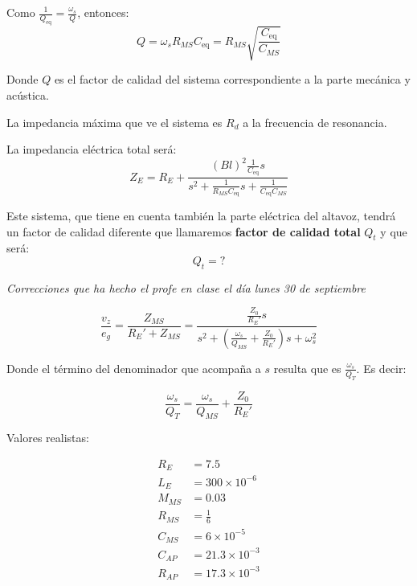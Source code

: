 \documentclass[12pt, a4paper]{article}
\begin{document}
Como $\frac{1}{Q _{\text{eq}}} = \frac{\omega_s}{Q}$, entonces:
\begin{equation} \label{eq:factor_calidad}
  Q = \omega_s R_{MS} C _{\text{eq}} = R_{MS} \sqrt{\frac{C _{\text{eq}}}{C_{MS}}}
\end{equation}

Donde $Q$ es el factor de calidad del sistema correspondiente a la parte mecánica y acústica.

La impedancia máxima que ve el sistema es $R_d$ a la frecuencia de resonancia.

La impedancia eléctrica total será:
\begin{equation} \label{eq:impedancia_electrica}
  Z_E = R_E + \frac{\left( Bl \right)^2 \frac{1}{C _{\text{eq}}}s}{s^2 + \frac{1}{R_{MS}C _{\text{eq}}}s + \frac{1}{C _{\text{eq}}C_{MS}}}
\end{equation}

Este sistema, que tiene en cuenta también la parte eléctrica del altavoz, tendrá un factor de calidad diferente que llamaremos \textbf{factor de calidad total} $Q_t$ y que será:
\begin{equation} \label{eq:factor_calidad_total}
  Q_t = ?
\end{equation}

\textit{Correcciones que ha hecho el profe en clase el día lunes 30 de septiembre}

\[ \frac{v_z}{e_g} = \frac{Z_{MS}}{R_E' + Z_{MS}} = \frac{\frac{Z_0}{R_E'}s}{s^2 + \left( \frac{\omega_s}{Q_{MS}} + \frac{Z_0}{R_E'} \right) s + \omega_s^2} \]

Donde el término del denominador que acompaña a $s$ resulta que es $\frac{\omega_s}{Q_T}$. Es decir:

\[ \frac{\omega_s}{Q_T} = \frac{\omega_s}{Q_{MS}} + \frac{Z_0}{R_E'} \]

Valores realistas:

\begin{align*}
  R_E    & = 7.5                 \\
  L_E    & = 300 \times 10^{-6}  \\
  M_{MS} & = 0.03                \\
  R_{MS} & = \frac{1}{6}         \\
  C_{MS} & = 6 \times 10^{-5}    \\
  C_{AP} & = 21.3 \times 10^{-3} \\
  R_{AP} & = 17.3 \times 10^{-3} \\
\end{align*}
\end{document}
